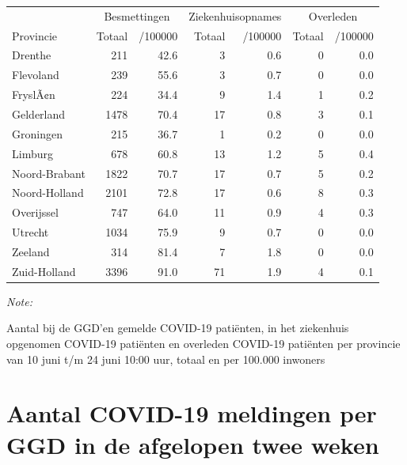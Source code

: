 \documentclass[
  english,
  man,floatsintext]{apa6}
\begin{document}
\begin{table}
\centering
\begin{threeparttable}
\begin{tabular}{lrrrrrr}
\toprule
\multicolumn{1}{c}{ } & \multicolumn{2}{c}{Besmettingen} & \multicolumn{2}{c}{Ziekenhuisopnames} & \multicolumn{2}{c}{Overleden} \\
\cmidrule(l{3pt}r{3pt}){2-3} \cmidrule(l{3pt}r{3pt}){4-5} \cmidrule(l{3pt}r{3pt}){6-7}
Provincie & Totaal & /100000 & Totaal & /100000 & Totaal & /100000\\
\midrule
Drenthe & 211 & 42.6 & 3 & 0.6 & 0 & 0.0\\
Flevoland & 239 & 55.6 & 3 & 0.7 & 0 & 0.0\\
FryslÃ¢n & 224 & 34.4 & 9 & 1.4 & 1 & 0.2\\
Gelderland & 1478 & 70.4 & 17 & 0.8 & 3 & 0.1\\
Groningen & 215 & 36.7 & 1 & 0.2 & 0 & 0.0\\
Limburg & 678 & 60.8 & 13 & 1.2 & 5 & 0.4\\
Noord-Brabant & 1822 & 70.7 & 17 & 0.7 & 5 & 0.2\\
Noord-Holland & 2101 & 72.8 & 17 & 0.6 & 8 & 0.3\\
Overijssel & 747 & 64.0 & 11 & 0.9 & 4 & 0.3\\
Utrecht & 1034 & 75.9 & 9 & 0.7 & 0 & 0.0\\
Zeeland & 314 & 81.4 & 7 & 1.8 & 0 & 0.0\\
Zuid-Holland & 3396 & 91.0 & 71 & 1.9 & 4 & 0.1\\
\bottomrule
\end{tabular}
\begin{tablenotes}
\item \textit{Note: } 
\item Aantal bij de GGD’en gemelde COVID-19 patiënten, in het ziekenhuis opgenomen COVID-19 patiënten en overleden COVID-19 patiënten per provincie van 10 juni t/m 24 juni 10:00 uur, totaal en per 100.000 inwoners
\end{tablenotes}
\end{threeparttable}
\end{table}

\newpage

\hypertarget{aantal-covid-19-meldingen-per-ggd-in-de-afgelopen-twee-weken}{%
\section{Aantal COVID-19 meldingen per GGD in de afgelopen twee weken}\label{aantal-covid-19-meldingen-per-ggd-in-de-afgelopen-twee-weken}}
\end{document}
